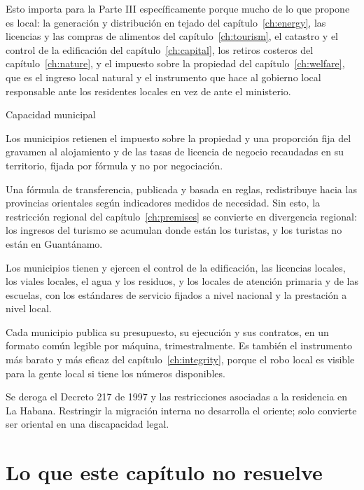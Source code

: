 Esto importa para la Parte III específicamente porque mucho de lo que propone es
local: la generación y distribución en tejado del capítulo~\ref{ch:energy}, las
licencias y las compras de alimentos del capítulo~\ref{ch:tourism}, el catastro y el
control de la edificación del capítulo~\ref{ch:capital}, los retiros costeros del
capítulo~\ref{ch:nature}, y el impuesto sobre la propiedad del
capítulo~\ref{ch:welfare}, que es el ingreso local natural y el instrumento que hace
al gobierno local responsable ante los residentes locales en vez de ante el
ministerio.

\begin{design}{Capacidad municipal}
\label{d:municipal}
\begin{rules}
 Los municipios retienen el impuesto sobre la propiedad y una
proporción fija del gravamen al alojamiento y de las tasas de licencia de negocio
recaudadas en su territorio, fijada por fórmula y no por negociación.

 Una fórmula de transferencia, publicada y basada en reglas,
redistribuye hacia las provincias orientales según indicadores medidos de necesidad.
Sin esto, la restricción regional del capítulo~\ref{ch:premises} se convierte en
divergencia regional: los ingresos del turismo se acumulan donde están los turistas,
y los turistas no están en Guantánamo.

 Los municipios tienen y ejercen el control de la edificación, las
licencias locales, los viales locales, el agua y los residuos, y los locales de
atención primaria y de las escuelas, con los estándares de servicio fijados a nivel
nacional y la prestación a nivel local.

 Cada municipio publica su presupuesto, su ejecución y sus contratos,
en un formato común legible por máquina, trimestralmente. Es también el instrumento
más barato y más eficaz del capítulo~\ref{ch:integrity}, porque el robo local es
visible para la gente local si tiene los números disponibles.

 Se deroga el Decreto 217 de 1997 y las restricciones
asociadas a la residencia en La Habana. Restringir la migración interna no desarrolla
el oriente; solo convierte ser oriental en una discapacidad legal.
\end{rules}
\end{design}

\section{Lo que este capítulo no resuelve}

